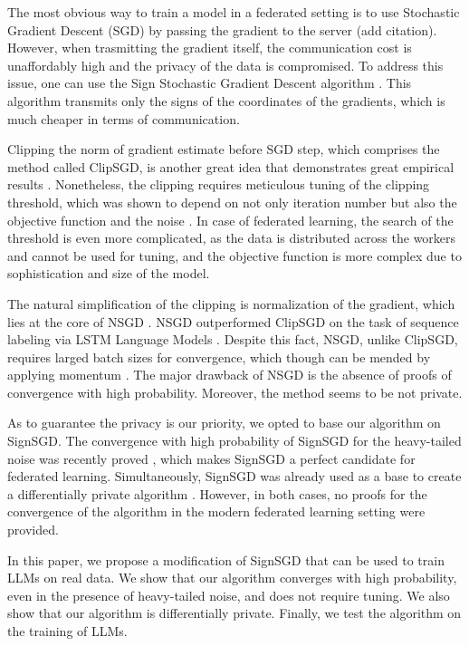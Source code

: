 \documentclass{article}
\newcommand{\algname}[1]{{\sf  #1}\xspace}
\begin{document}
The most obvious way to train a model in a federated setting is to use Stochastic Gradient Descent (\algname{SGD}) \parencite{Robbins1951} by passing the gradient to the server (add citation). However, when trasmitting the gradient itself, the communication cost is unaffordably high and the privacy of the data is compromised. To address this issue, one can use the Sign Stochastic Gradient Descent algorithm \parencite{Bernstein2018}. This algorithm transmits only the signs of the coordinates of the gradients, which is much cheaper in terms of communication.

Clipping the norm of gradient estimate before \algname{SGD} step, which comprises the method called \algname{ClipSGD}, is another great idea that demonstrates great empirical results \parencite{Pascanu2013, Goodfellow2016}. Nonetheless, the clipping requires meticulous tuning of the clipping threshold, which was shown to depend on not only iteration number but also the objective function and the noise \parencite[Theorem $3.1$]{Sadiev2023}. In case of federated learning, the search of the threshold is even more complicated, as the data is distributed across the workers and cannot be used for tuning, and the objective function is more complex due to sophistication and size of the model.

The natural simplification of the clipping is normalization of the gradient, which lies at the core of \algname{NSGD} \parencite{Hazan2015}. \algname{NSGD} outperformed \algname{ClipSGD} on the task of sequence labeling via LSTM Language Models \cite{Merity2017}. Despite this fact, \algname{NSGD}, unlike \algname{ClipSGD}, requires larged batch sizes for convergence, which though can be mended by applying momentum \cite{Cutkosky2020}. The major drawback of \algname{NSGD} is the absence of proofs of convergence with high probability. Moreover, the method seems to be not private.

As to guarantee the privacy is our priority, we opted to base our algorithm on \algname{SignSGD}. The convergence with high probability of \algname{SignSGD} for the heavy-tailed noise was recently proved \parencite{Kornilov2025}, which makes \algname{SignSGD} a perfect candidate for federated learning. Simultaneously, \algname{SignSGD} was already used as a base to create a differentially private algorithm \parencite{Jin2020}. However, in both cases, no proofs for the convergence of the algorithm in the modern federated learning setting were provided.

In this paper, we propose a modification of \algname{SignSGD} that can be used to train LLMs on real data. We show that our algorithm converges with high probability, even in the presence of heavy-tailed noise, and does not require tuning. We also show that our algorithm is differentially private. Finally, we test the algorithm on the training of LLMs.
\end{document}
